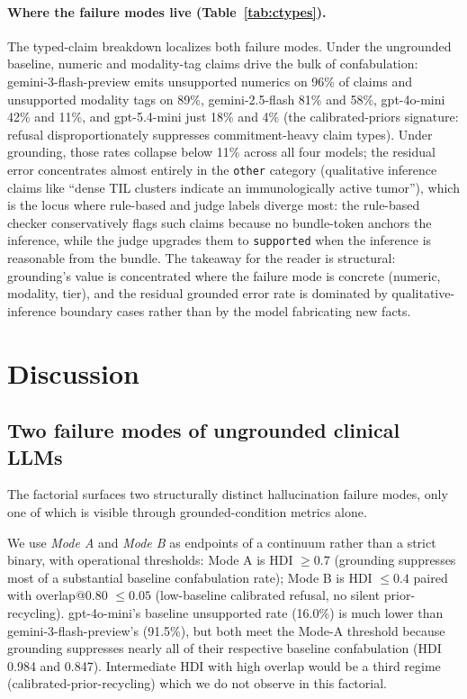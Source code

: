 \documentclass{article}
\theoremstyle{plain}
\begin{document}
\paragraph{Where the failure modes live (Table~\ref{tab:ctypes}).}
The typed-claim breakdown localizes both failure modes. Under the ungrounded baseline, numeric and modality-tag claims drive the bulk of confabulation: gemini-3-flash-preview emits unsupported numerics on 96\% of claims and unsupported modality tags on 89\%, gemini-2.5-flash 81\% and 58\%, gpt-4o-mini 42\% and 11\%, and gpt-5.4-mini just 18\% and 4\% (the calibrated-priors signature: refusal disproportionately suppresses commitment-heavy claim types). Under grounding, those rates collapse below 11\% across all four models; the residual error concentrates almost entirely in the \texttt{other} category (qualitative inference claims like ``dense TIL clusters indicate an immunologically active tumor''), which is the locus where rule-based and judge labels diverge most: the rule-based checker conservatively flags such claims because no bundle-token anchors the inference, while the judge upgrades them to \texttt{supported} when the inference is reasonable from the bundle. The takeaway for the reader is structural: grounding's value is concentrated where the failure mode is concrete (numeric, modality, tier), and the residual grounded error rate is dominated by qualitative-inference boundary cases rather than by the model fabricating new facts.

\section{Discussion}
\label{sec:discussion}

\subsection{Two failure modes of ungrounded clinical LLMs}

The factorial surfaces two structurally distinct hallucination failure modes, only one of which is visible through grounded-condition metrics alone.

We use \emph{Mode A} and \emph{Mode B} as endpoints of a continuum rather than a strict binary, with operational thresholds: Mode A is HDI $\geq 0.7$ (grounding suppresses most of a substantial baseline confabulation rate); Mode B is HDI $\leq 0.4$ paired with overlap@0.80 $\leq 0.05$ (low-baseline calibrated refusal, no silent prior-recycling). gpt-4o-mini's baseline unsupported rate (16.0\%) is much lower than gemini-3-flash-preview's (91.5\%), but both meet the Mode-A threshold because grounding suppresses nearly all of their respective baseline confabulation (HDI 0.984 and 0.847). Intermediate HDI with high overlap would be a third regime (calibrated-prior-recycling) which we do not observe in this factorial.
\end{document}
